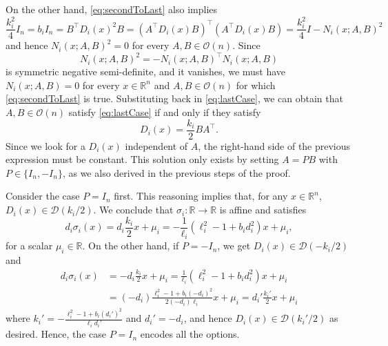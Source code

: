\documentclass{article}
\theoremstyle{plain}
\theoremstyle{definition}
\theoremstyle{definition}
\theoremstyle{remark}
\theoremstyle{definition}
\theoremstyle{definition}
\theoremstyle{remark}
\numberwithin{equation}{section}
\begin{document}
On the other hand, \eqref{eq:secondToLast} also implies
\[
\frac{k_i^2}{4}I_n = b_iI_n = B^\top D_i(x)^2B= (A^\top D_i(x)B)^\top(A^\top D_i(x)B)= \frac{k_i^2}{4}I - N_i(x;A,B)^2
\]
and hence $N_i(x;A,B)^2=0$ for every $A,B\in\mathcal{O}(n)$. Since 
\[
N_i(x;A,B)^2=-N_i(x;A,B)^\top N_i(x;A,B)
\]
is symmetric negative semi-definite, and it vanishes, we must have $N_i(x;A,B)=0$ for every $x\in\mathbb{R}^n$ and $A,B\in\mathcal{O}(n)$ for which \eqref{eq:secondToLast} is true.
Substituting back in \eqref{eq:lastCase}, we can obtain that $A,B\in\mathcal{O}(n)$ satisfy \eqref{eq:lastCase} if and only if they satisfy
\begin{equation}\label{eq:BAdiag}
D_i(x) = \frac{k_i}{2} BA^\top.
\end{equation}
Since we look for a $D_i(x)$ independent of $A$, the right-hand side of the previous expression must be constant. This solution only exists by setting $A=PB$ with $P\in\{I_n,-I_n\}$, as we also derived in the previous steps of the proof.

Consider the case $P=I_n$ first. This reasoning implies that, for any $x\in\mathbb{R}^n$, $D_i(x)\in\mathcal{D}(k_i/2)$. We conclude that $\sigma_i:\mathbb{R}\to\mathbb{R}$ is affine and satisfies
\[
d_i\sigma_i(x)=d_i\frac{k_i}{2} x + \mu_i = -\frac{1}{\ell_i}(\ell_i^2-1+b_id_i^2)x+\mu_i,
\]
for a scalar $\mu_i\in\mathbb{R}$. On the other hand, if $P=-I_n$, we get $D_i(x)\in\mathcal{D}(-k_i/2)$ and
\[
\begin{aligned}
d_i\sigma_i(x) & = -d_i\frac{k_i}{2}x+\mu_i = \frac{1}{\ell_i}(\ell_i^2-1+b_id_i^2)x+\mu_i\\
& =(-d_i)\frac{\ell_i^2-1+b_i(-d_i)^2}{2(-d_i)\ell_i}x+\mu_i=d_i'\frac{k_i'}{2}x+\mu_i
\end{aligned}
\]
where $k_i' = -\frac{\ell_i^2-1+b_i(d_i')^2}{\ell_id_i'}$ and $d_i'=-d_i$, and hence $D_i(x)\in\mathcal{D}(k_i'/2)$ as desired. Hence, the case $P=I_n$ encodes all the options.
\end{document}
